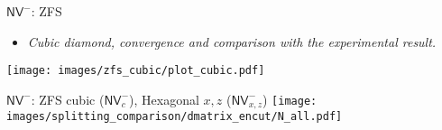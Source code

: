 \begin{frame}{$ \mathsf{NV}^{-} $: ZFS } %
  \begin{itemize}
    \item
      \textit{Cubic diamond, convergence and comparison with the experimental result.}
  \end{itemize}
  \texttt{[image: images/zfs\_cubic/plot\_cubic.pdf]}
\end{frame}

\begin{frame}{$ \mathsf{NV}^{-} $: ZFS cubic ($ \mathsf{NV}^{-}_{c} $), Hexagonal $ x,z $ ($ \mathsf{NV}_{x,z}^{-} $)   } %
  \texttt{[image: images/splitting\_comparison/dmatrix\_encut/N\_all.pdf]}
\end{frame}

